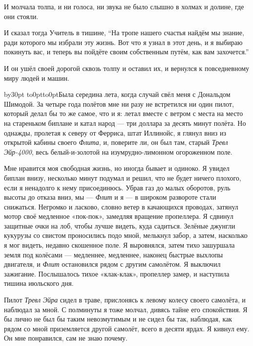 И молчала толпа, и ни голоса, ни звука не было слышно в холмах и долине, где они стояли.

И сказал тогда Учитель в тишине, ``На тропе нашего счастья найдём мы знание, ради которого мы
избрали эту жизнь. Вот что я узнал в этот день, и я выбираю покинуть вас, и теперь вы пойдёте
своим собственным путём, как вам захочется.''

И он ушёл своей дорогой сквозь толпу и оставил их, и вернулся к повседневному миру людей и машин.

\endgroup
\vfil\eject

{}
\vskip3cm

\begingroup{}
\def\par{\endgraf\endgroup}
\advance\parindent by30pt \hang{}
\noindent\vtop to0pt{\kern-8pt\hbox to0pt{\hss\kern\parindent\bukvfont Б\kern3pt}\vss}ыла середина
лета, когда случай свёл меня с Дональдом Шимодой.
За четыре года полётов мне ни разу не встретился ни один пилот, который делал бы то же самое, что
и я: летал вместе с ветром с места на место на стареньком биплане и катал народ --- три доллара
за десять минут полёта. Но однажды, пролетая к северу от Ферриса, штат Иллинойс, я глянул вниз из
открытой кабины своего {\it Флита}, и, поверите ли, он был там, старый {\it Тревл Эйр-4000}, весь
белый-и-золотой на изумрудно-лимонном огороженном поле.

Мне нравится моя свободная жизнь, но иногда бывает и одиноко. Я увидел биплан внизу, несколько
минут подумал и решил, что не будет ничего плохого, если я ненадолго к нему присоединюсь. Убрав
газ до малых оборотов, руль высоты до отказа вниз, мы --- {\it Флит\/} и я --- в широком развороте стали
снижаться. Негромко и ласково, словно ветер в качающихся проводах, затянул мотор своё медленное
«пок-пок», замедляя вращение пропеллера. Я сдвинул защитные очки на лоб, чтобы лучше видеть, куда
садиться. Зелёные джунгли кукурузы со свистом проносились подо мной, мелькнул забор, а затем,
насколько я мог видеть, недавно скошенное поле. Я выровнялся, затем тихо зашуршала земля под
колёсами --- медленнее, медленнее, наконец быстрые выхлопы двигателя, и {\it Флит\/} остановился
рядом с другим самолётом. Я выключил зажигание. Послышалось тихое «клак-клак», пропеллер замер, и наступила тишина июльского дня.

Пилот {\it Тревл Эйра\/} сидел в траве, прислонясь к левому колесу своего самолёта, и наблюдал за мной. С полминуты я тоже молчал, дивясь тайне его спокойствия. Я бы лично не был бы таким невозмутимым и не сидел бы так, наблюдая, как рядом со мной приземляется другой самолёт, всего в десяти ярдах. Я кивнул ему. Он мне понравился, сам не знаю почему.

